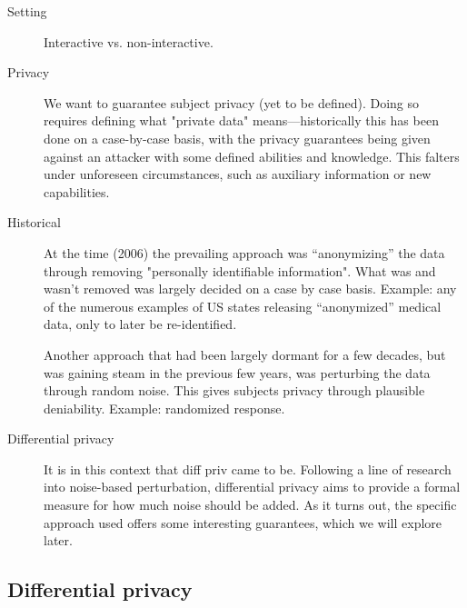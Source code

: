 \documentclass[12pt]{article}
\begin{document}
\begin{description}
    \item[Setting] Interactive vs. non-interactive.

    \item[Privacy] We want to guarantee subject privacy (yet to be defined). Doing so requires defining what "private data" means---historically this has been done on a case-by-case basis, with the privacy guarantees being given against an attacker with some defined abilities and knowledge. This falters under unforeseen circumstances, such as auxiliary information or new capabilities.
    
    \item[Historical] At the time (2006) the prevailing approach was ``anonymizing'' the data through removing "personally identifiable information". What was and wasn't removed was largely decided on a case by case basis. Example: any of the numerous examples of US states releasing ``anonymized'' medical data, only to later be re-identified.
    
    Another approach that had been largely dormant for a few decades, but was gaining steam in the previous few years, was perturbing the data through random noise. This gives subjects privacy through plausible deniability. Example: randomized response.
    
    \item[Differential privacy] It is in this context that diff priv came to be. Following a line of research into noise-based perturbation, differential privacy aims to provide a formal measure for how much noise should be added. As it turns out, the specific approach used offers some interesting guarantees, which we will explore later.
\end{description}

\subsection{Differential privacy \label{sec:promise}} 
\end{document}
